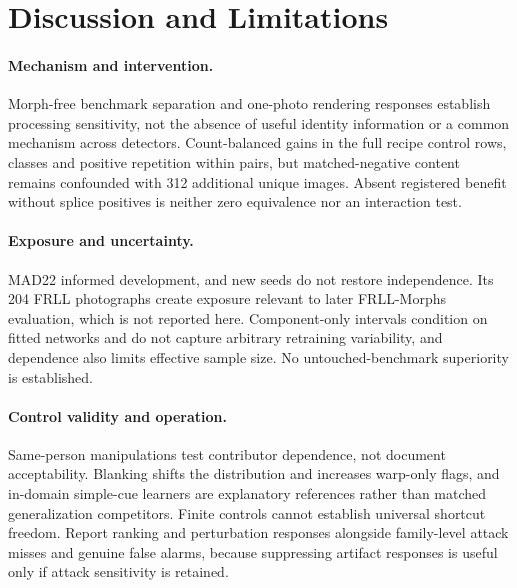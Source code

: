 \documentclass[10pt,twocolumn,letterpaper]{article}
\begin{document}
\section{Discussion and Limitations}
\paragraph{Mechanism and intervention.}
Morph-free benchmark separation and one-photo rendering responses establish processing sensitivity, not the absence of useful identity information or a common mechanism across detectors. Count-balanced gains in the full recipe control rows, classes and positive repetition within pairs, but matched-negative content remains confounded with 312 additional unique images. Absent registered benefit without splice positives is neither zero equivalence nor an interaction test.

\paragraph{Exposure and uncertainty.}
MAD22 informed development, and new seeds do not restore independence. Its 204 FRLL photographs create exposure relevant to later FRLL-Morphs evaluation, which is not reported here. Component-only intervals condition on fitted networks and do not capture arbitrary retraining variability, and dependence also limits effective sample size. No untouched-benchmark superiority is established.

\paragraph{Control validity and operation.}
Same-person manipulations test contributor dependence, not document acceptability. Blanking shifts the distribution and increases warp-only flags, and in-domain simple-cue learners are explanatory references rather than matched generalization competitors. Finite controls cannot establish universal shortcut freedom. Report ranking and perturbation responses alongside family-level attack misses and genuine false alarms, because suppressing artifact responses is useful only if attack sensitivity is retained.
\end{document}
